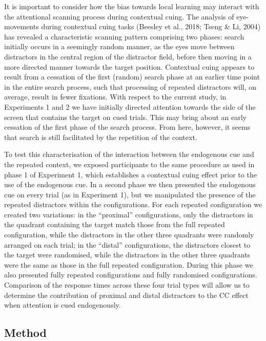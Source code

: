 \documentclass[
  man,
  floatsintext,
  longtable,
  nolmodern,
  notxfonts,
  notimes,
  colorlinks=true,linkcolor=blue,citecolor=blue,urlcolor=blue]{apa7}
\begin{document}
It is important to consider how the bias towards local learning may
interact with the attentional scanning process during contextual cuing.
The analysis of eye-movements during contextual cuing tasks (Beesley et
al., 2018; Tseng \& Li, 2004) has revealed a characteristic scanning
pattern comprising two phases: search initially occurs in a seemingly
random manner, as the eyes move between distractors in the central
region of the distractor field, before then moving in a more directed
manner towards the target position. Contextual cuing appears to result
from a cessation of the first (random) search phase at an earlier time
point in the entire search process, such that processing of repeated
distractors will, on average, result in fewer fixations. With respect to
the current study, in Experiments 1 and 2 we have initially directed
attention towards the side of the screen that contains the target on
cued trials. This may bring about an early cessation of the first phase
of the search process. From here, however, it seems that search is still
facilitated by the repetition of the context.

To test this characterisation of the interaction between the endogenous
cue and the repeated context, we exposed participants to the same
procedure as used in phase 1 of Experiment 1, which establishes a
contextual cuing effect prior to the use of the endogenous cue. In a
second phase we then presented the endogenous cue on every trial (as in
Experiment 1), but we manipulated the presence of the repeated
distractors within the configurations. For each repeated configuration
we created two variations: in the ``proximal'' configurations, only the
distractors in the quadrant containing the target match those from the
full repeated configuration, while the distractors in the other three
quadrants were randomly arranged on each trial; in the ``distal''
configurations, the distractors closest to the target were randomised,
while the distractors in the other three quadrants were the same as
those in the full repeated configuration. During this phase we also
presented fully repeated configurations and fully randomised
configurations. Comparison of the response times across these four trial
types will allow us to determine the contribution of proximal and distal
distractors to the CC effect when attention is cued endogenously.

\subsection{Method}\label{method-2}
\end{document}
